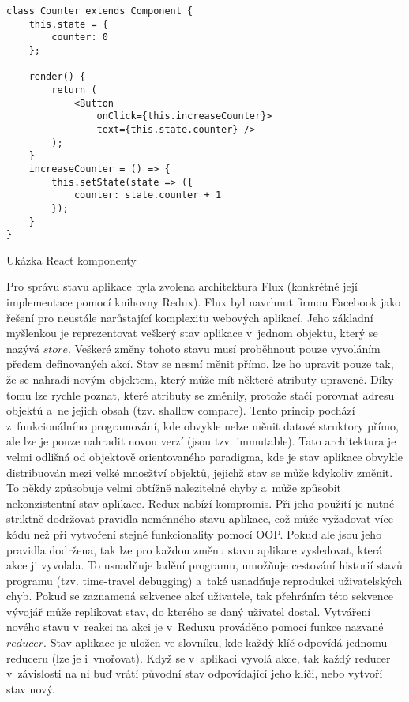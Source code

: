 \begin{listing}
\begin{verbatim}
class Counter extends Component {
    this.state = {
        counter: 0
    };

    render() {
        return (
            <Button
                onClick={this.increaseCounter}>
                text={this.state.counter} />
        );
    }
    increaseCounter = () => {
        this.setState(state => ({
            counter: state.counter + 1
        });
    }
}
\end{verbatim}
\caption{Ukázka React komponenty}
\label{code:reactcomponent}
\end{listing}

Pro správu stavu aplikace byla zvolena architektura Flux (konkrétně její implementace pomocí knihovny Redux). Flux byl navrhnut firmou Facebook jako řešení pro neustále narůstající komplexitu webových aplikací. Jeho základní myšlenkou je reprezentovat veškerý stav aplikace v~jednom objektu, který se nazývá $store$. Veškeré změny tohoto stavu musí proběhnout pouze vyvoláním předem definovaných akcí. Stav se nesmí měnit přímo, lze ho upravit pouze tak, že se nahradí novým objektem, který může mít některé atributy upravené. Díky tomu lze rychle poznat, které atributy se změnily, protože stačí porovnat adresu objektů a~ne jejich obsah (tzv. shallow compare). Tento princip pochází z~funkcionálního programování, kde obvykle nelze měnit datové struktory přímo, ale lze je pouze nahradit novou verzí (jsou tzv. immutable). Tato architektura je velmi odlišná od objektově orientovaného paradigma, kde je stav aplikace obvykle distribuován mezi velké mnosžtví objektů, jejichž stav se může kdykoliv změnit. To někdy způsobuje velmi obtížně nalezitelné chyby a~může způsobit nekonzistentní stav aplikace. Redux nabízí kompromis. Při jeho použití je nutné striktně dodržovat pravidla neměnného stavu aplikace, což může vyžadovat více kódu než při vytvoření stejné funkcionality pomocí OOP. Pokud ale jsou jeho pravidla dodržena, tak lze pro každou změnu stavu aplikace vysledovat, která akce ji vyvolala. To usnadňuje ladění programu, umožňuje cestování historií stavů programu (tzv. time-travel debugging) a~také usnadňuje reprodukci uživatelských chyb. Pokud se zaznamená sekvence akcí uživatele, tak přehráním této sekvence vývojář může replikovat stav, do kterého se daný uživatel dostal. 
Vytváření nového stavu v~reakci na akci je v~Reduxu prováděno pomocí funkce nazvané $reducer$. Stav aplikace je uložen ve slovníku, kde každý klíč odpovídá jednomu reduceru (lze je i~vnořovat). Když se v~aplikaci vyvolá akce, tak každý reducer v~závislosti na ni buď vrátí původní stav odpovídající jeho klíči, nebo vytvoří stav nový.
